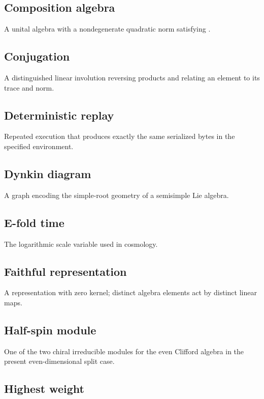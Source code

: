 \documentclass[11pt]{article}
\begin{document}
\subsection{Composition algebra}

A unital algebra with a nondegenerate quadratic norm satisfying \texttt{}.

\subsection{Conjugation}

A distinguished linear involution reversing products and relating an element to its trace and norm.

\subsection{Deterministic replay}

Repeated execution that produces exactly the same serialized bytes in the specified environment.

\subsection{Dynkin diagram}

A graph encoding the simple-root geometry of a semisimple Lie algebra.

\subsection{E-fold time}

The logarithmic scale variable \texttt{} used in cosmology.

\subsection{Faithful representation}

A representation with zero kernel; distinct algebra elements act by distinct linear maps.

\subsection{Half-spin module}

One of the two chiral irreducible modules for the even Clifford algebra in the present even-dimensional split case.

\subsection{Highest weight}
\end{document}
